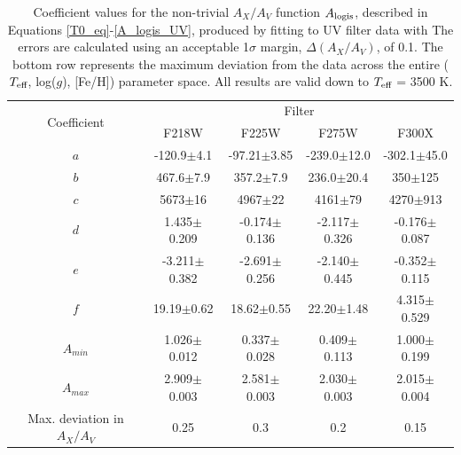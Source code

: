 \documentclass[12pt, a4paper]{report}
\begin{document}
\begin{table}
\begin{center}
\begin{tabular}{ccccc}
\hline
\multirow{2}{*}{Coefficient} & \multicolumn{4}{c}{Filter} \\
 & F218W & F225W & F275W & F300X \\
\hline
$a$ & -120.9$\pm$4.1 & -97.21$\pm$3.85 & -239.0$\pm$12.0 & -302.1$\pm$45.0 \\
$b$ & 467.6$\pm$7.9 & 357.2$\pm$7.9 & 236.0$\pm$20.4 & 350$\pm$125 \\
$c$ & 5673$\pm$16 & 4967$\pm$22 & 4161$\pm$79 & 4270$\pm$913 \\
$d$ & 1.435$\pm$0.209 & -0.174$\pm$0.136 & -2.117$\pm$0.326 & -0.176$\pm$0.087 \\
$e$ & -3.211$\pm$0.382 & -2.691$\pm$0.256  & -2.140$\pm$0.445 & -0.352$\pm$0.115 \\
$f$ & 19.19$\pm$0.62 & 18.62$\pm$0.55  & 22.20$\pm$1.48 & 4.315$\pm$0.529 \\
$A_{min}$ & 1.026$\pm$0.012 & 0.337$\pm$0.028 & 0.409$\pm$0.113 & 1.000$\pm$0.199 \\
$A_{max}$ & 2.909$\pm$0.003 & 2.581$\pm$0.003 & 2.030$\pm$0.003 & 2.015$\pm$0.004 \\
\hline
Max. deviation in $A_{X}/A_{V}$ & 0.25 & 0.3 & 0.2 & 0.15 \\
\hline
\end{tabular}
\caption{Coefficient values for the non-trivial $A_{X}/A_{V}$ function $A_{\textnormal{logis}}$, described in Equations \ref{T0_eq}-\ref{A_logis_UV}, produced by fitting to UV filter data with The errors are calculated using an acceptable 1$\sigma$ margin, $\Delta(A_{X}/A_{V})$, of 0.1. The bottom row represents the maximum deviation from the data across the entire ($T_{\textnormal{eff}}$, log($g$), [Fe/H]) parameter space. All results are valid down to $T_{\textnormal{eff}}$ = 3500 K.}
\label{UV_coeffs_table}
\end{center}
\end{table}
\end{document}

